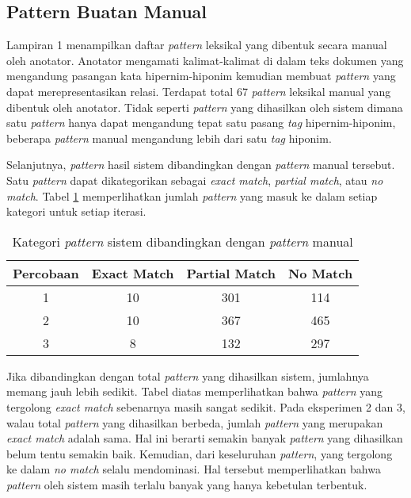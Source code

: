 \subsection{Pattern Buatan Manual}
Lampiran 1 menampilkan daftar \textit{pattern} leksikal yang dibentuk secara manual oleh anotator. Anotator mengamati kalimat-kalimat di dalam teks dokumen yang mengandung pasangan kata hipernim-hiponim kemudian membuat \textit{pattern} yang dapat merepresentasikan relasi. Terdapat total 67 \textit{pattern} leksikal manual yang dibentuk oleh anotator. Tidak seperti \textit{pattern} yang dihasilkan oleh sistem dimana satu \textit{pattern} hanya dapat mengandung tepat satu pasang \textit{tag} hipernim-hiponim, beberapa \textit{pattern} manual mengandung lebih dari satu \textit{tag} hiponim.

Selanjutnya, \textit{pattern} hasil sistem dibandingkan dengan \textit{pattern} manual tersebut. Satu \textit{pattern} dapat dikategorikan sebagai \textit{exact match}, \textit{partial match}, atau \textit{no match}. Tabel \ref{table:psis-kategori} memperlihatkan jumlah \textit{pattern} yang masuk ke dalam setiap kategori untuk setiap iterasi.

\begin{table}
  \centering
  \caption{Kategori \textit{pattern} sistem dibandingkan dengan \textit{pattern} manual}
  \label{table:psis-kategori}
  \begin{tabular}{|c|c|c|c|}
  \hline
  Percobaan & Exact Match & Partial Match & No Match \\ \hline
  1 & 10 & 301 & 114 \\ \hline
  2 & 10 & 367 & 465 \\ \hline
  3 & 8 & 132 & 297 \\ \hline 
  \end{tabular} 
\end{table}

Jika dibandingkan dengan total \textit{pattern} yang dihasilkan sistem, jumlahnya memang jauh lebih sedikit. Tabel diatas memperlihatkan bahwa \textit{pattern} yang tergolong \textit{exact match} sebenarnya masih sangat sedikit. Pada eksperimen 2 dan 3, walau total \textit{pattern} yang dihasilkan berbeda, jumlah \textit{pattern} yang merupakan \textit{exact match} adalah sama. Hal ini berarti semakin banyak \textit{pattern} yang dihasilkan belum tentu semakin baik. Kemudian, dari keseluruhan \textit{pattern}, yang tergolong ke dalam \textit{no match} selalu mendominasi. Hal tersebut memperlihatkan bahwa  \textit{pattern} oleh sistem masih terlalu banyak yang hanya kebetulan terbentuk.

